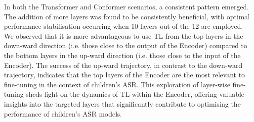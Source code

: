 In both the Transformer and Conformer scenarios, a consistent pattern emerged. The addition of more layers was found to be consistently beneficial, with optimal performance stabilisation occurring when 10 layers out of the 12 are employed. We observed that it is more advantageous to use \ac{TL} from the top layers in the down-ward direction (i.e. those close to the output of the Encoder) compared to the bottom layers in the up-ward direction (i.e. those close to the input of the Encoder). The success of the up-ward trajectory, in contrast to the down-ward trajectory, indicates that the top layers of the Encoder are the most relevant to fine-tuning in the context of children's \ac{ASR}. This exploration of layer-wise fine-tuning sheds light on the dynamics of \ac{TL} within the Encoder, offering valuable insights into the targeted layers that significantly contribute to optimising the performance of children's \ac{ASR} models. 

